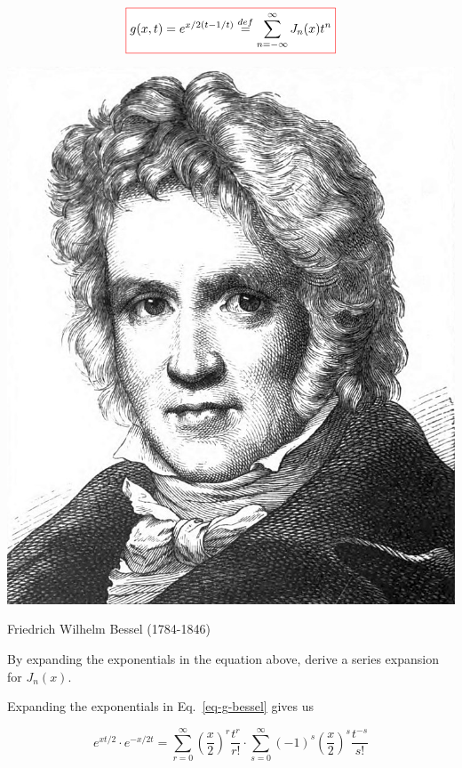 \begin{equation}
\fbox{$\displaystyle
 g(x,t) =   e^{x/2(t-1/t)}  \stackrel{def}{=} \sum_{n = - \infty}^{\infty} J_n(x)t^n
    $}
  \label{eq-g-bessel}
\end{equation}

\begin{marginfigure}[-2cm]
  \includegraphics{bessel/figures/f_bessel}
  \caption{Friedrich Wilhelm Bessel (1784-1846)}
\end{marginfigure}

\begin{cue}
By expanding the exponentials in the equation above, derive a series expansion for $J_n(x)$.  
\end{cue}

Expanding the exponentials in Eq.~\ref{eq-g-bessel} gives us

\begin{equation}
e^{xt/2} \cdot e^{-x/2t} = \sum_{r = 0}^{\infty} {\left(\frac{x}{2}\right)}^r \frac{t^r}{r!} \cdot \sum_{s = 0}^{\infty} {(-1)}^s { \left(\frac{x}{2}\right)}^s \frac{t^{-s}}{s!}
\end{equation} 

